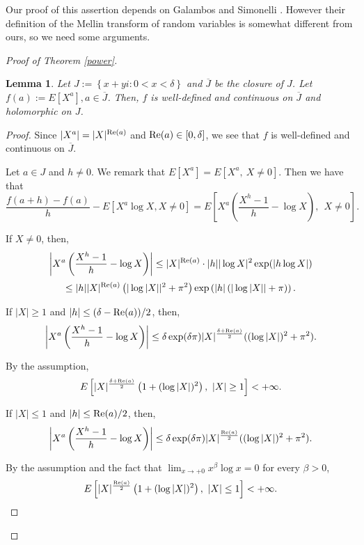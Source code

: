 \documentclass[a4paper, reqno, 11pt]{amsart}
\newtheorem{Lem}[Thm]{Lemma}
\theoremstyle{definition}
\begin{document}
Our proof of this assertion depends on Galambos and Simonelli \cite[Theorem 1.19]{galambos2004}. 
However their definition of  the Mellin transform of random variables is somewhat different from ours, so we need some arguments. 

\begin{proof}[Proof of Theorem \ref{power}]

\begin{Lem}\label{F-hol}
Let $J := \left\{x+y i : 0 < x < \delta \right\}$ and $ \overline{J}$ be the closure of $J$.  
Let $f(a) := E[X^a], a \in \overline{J}$. 
Then, $f$ is well-defined and continuous on $\overline{J}$ and holomorphic on $J$. 
\end{Lem}

\begin{proof}
Since $|X^a| = |X|^{\textup{Re}(a)}$ and $\textup{Re}(a) \in [0, \delta]$,
we see that $f$ is well-defined and continuous on $\overline{J}$. 

Let $a \in J$ and $h \ne 0$.  
We remark that $E[X^a] = E\left[X^a, \ X \ne 0\right]$. 
Then we have that 
\[ \frac{f(a+h) - f(a)}{h} - E[X^a \log X, X \ne 0] = E\left[X^a \left( \frac{X^h - 1}{h} - \log X \right), \ \  X \ne 0 \right].  \]

If $X \ne 0$, then, 
\[ \left| X^a \left(\frac{X^h - 1}{h} - \log X  \right) \right| \le |X|^{\textup{Re}(a)} \cdot  |h| |\log X|^{2}  \exp(|h \log X|)  \]
\[ \le |h|  |X|^{\textup{Re}(a)}   \left( |\log |X||^{2} + \pi^2 \right)  \exp\left(|h| \left( |\log |X|| + \pi \right) \right).  \]

If $|X| \ge 1$ and $|h| \le (\delta - \textup{Re}(a))/2$, then, 
\[ \left|  X^a \left( \frac{X^h - 1}{h} - \log X \right) \right| \le \delta \exp(\delta \pi) |X|^{\frac{\delta + \textup{Re}(a)}{2}} ((\log |X|)^{2}  + \pi^2). \]

By the assumption, 
\[ E\left[  |X|^{\frac{\delta + \textup{Re}(a)}{2}} \left(1 + (\log |X|)^{2} \right), \ |X| \ge 1  \right] < +\infty. \]

If $|X| \le 1$ and $|h| \le \textup{Re}(a)/2$, then, 
\[ \left|  X^a \left( \frac{X^h - 1}{h} - \log X \right) \right| \le \delta \exp(\delta \pi) |X|^{\frac{\textup{Re}(a)}{2}} ((\log |X|)^{2}  + \pi^2). \]

By the assumption and the fact that $\displaystyle \lim_{x \to +0} x^{\beta} \log x = 0$ for every $\beta > 0$, %
\[ E\left[  |X|^{\frac{\textup{Re}(a)}{2}} \left(1 + (\log |X|)^{2} \right), \ |X| \le 1  \right] < +\infty. \]


\end{proof}
\end{proof}
\end{document}
